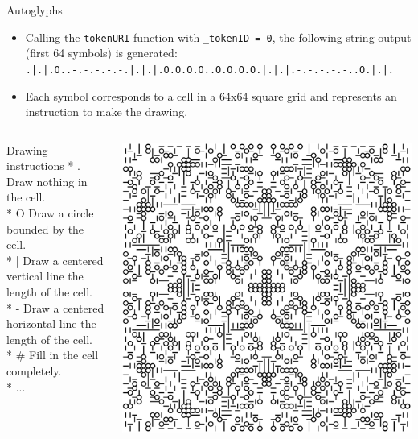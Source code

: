 \documentclass[handout]{beamer}
\begin{document}
\begin{frame}{Autoglyphs}
	\begin{itemize}
		\item Calling the \texttt{tokenURI} function with \texttt{\_tokenID = 0}, the following string output (first 64 symbols) is generated: {\scriptsize \texttt{.|.|.O..-.-.-.-.-.|.|.|.O.O.O.O..O.O.O.O.|.|.|.-.-.-.-.-..O.|.|.}}
		\item Each symbol corresponds to a cell in a 64x64 square grid and represents an instruction to make the drawing.
	\end{itemize}
	\begin{columns}
			\begin{samplecode}{Drawing instructions}
 				* 	.  Draw nothing in the cell.\\
 				* 	O  Draw a circle bounded by the cell.\\
				*   |  Draw a centered vertical line the length of the cell.\\
 				*   -  Draw a centered horizontal line the length of the cell.\\
 				*   \#  Fill in the cell completely. \\
 				* ...
			\end{samplecode}
			\centering
			\includegraphics[scale=0.2]{../assets/images/glyph1.png}
	\end{columns}
\end{frame}
\end{document}
